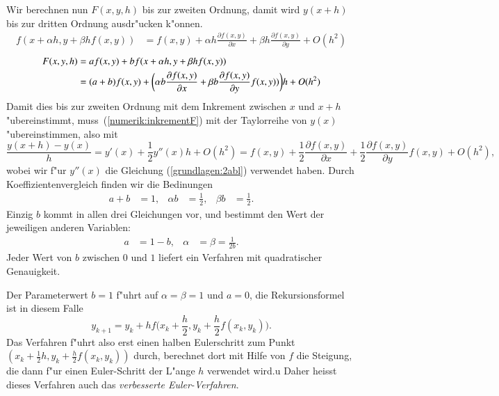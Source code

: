 Wir berechnen nun $F(x,y,h)$ bis zur zweiten Ordnung, damit wird 
$y(x+h)$ bis zur dritten Ordnung ausdr"ucken k"onnen.
\begin{align*}
f(x+\alpha h, y + \beta h f(x,y))
&=
f(x,y)+\alpha h\frac{\partial f(x,y)}{\partial x}
+ \beta h \frac{\partial f(x,y)}{\partial y} + O(h^2)
\end{align*}
\begin{align}
F(x,y,h)
&=
af(x,y) + bf(x+\alpha h, y + \beta h f(x,y))
\notag
\\
&=
(a+b)f(x,y) + \biggl(\alpha b\frac{\partial f(x,y)}{\partial x}
+ \beta b\frac{\partial f(x,y)}{\partial y} f(x,y))\biggr)h+O(h^2)
\label{numerik:inkrementF}
\end{align}
Damit dies bis zur zweiten Ordnung mit dem Inkrement zwischen $x$ und $x+h$
"ubereinstimmt, muss~(\ref{numerik:inkrementF}) mit der Taylorreihe
von $y(x)$ "ubereinstimmen, also mit
\begin{equation}
\frac{y(x+h)-y(x)}{h}=y'(x) + \frac12y''(x)h + O(h^2)
=f(x,y) + \frac12\frac{\partial f(x,y)}{\partial x}
+\frac12\frac{\partial f(x,y)}{\partial y}f(x,y) + O(h^2),
\label{numerik:ytaylor}
\end{equation}
wobei wir f"ur $y''(x)$ die Gleichung (\ref{grundlagen:2abl}) verwendet haben.
Durch Koeffizientenvergleich finden wir die Bedinungen
\[
\begin{aligned}
a+b&=1,&
\alpha b&=\frac12,&
\beta b&=\frac12.
\end{aligned}
\]
Einzig $b$ kommt in allen drei Gleichungen vor, und bestimmt den Wert der
jeweiligen anderen Variablen:
\[
\begin{aligned}
a&=1-b,&\alpha&= \beta=\frac{1}{2b}.
\end{aligned}
\]
Jeder Wert von $b$ zwischen $0$ und $1$ liefert ein Verfahren mit quadratischer
Genauigkeit.

Der Parameterwert $b=1$ f"uhrt auf $\alpha=\beta=1$ und $a=0$, die
Rekursionsformel ist in diesem Falle
\begin{equation}
y_{k+1}=y_{k}+hf\biggl(x_k+\frac{h}2,y_k+\frac{h}2 f(x_k,y_k)\biggr).
\label{numerik:improved-euler}
\end{equation}
Das Verfahren f"uhrt also erst einen halben Eulerschritt zum Punkt
$(x_k+\frac12h,y_k+\frac{h}2f(x_k,y_k))$ durch, berechnet dort mit Hilfe
von $f$ die Steigung, die dann f"ur einen Euler-Schritt der L"ange $h$
verwendet wird.u
Daher heisst dieses Verfahren auch das {\em verbesserte Euler-Verfahren}.

